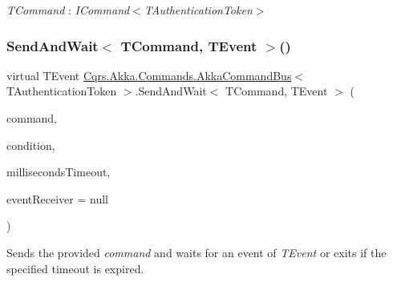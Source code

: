 \begin{Desc}
\item[Type Constraints]\begin{description}
\item[{\em T\+Command} : {\em I\+Command$<$T\+Authentication\+Token$>$}]\end{description}
\end{Desc}
\mbox{\label{classCqrs_1_1Akka_1_1Commands_1_1AkkaCommandBus_affd63fcc939b04803ca58dad194fc723}} 
\subsubsection{\texorpdfstring{Send\+And\+Wait$<$ T\+Command, T\+Event $>$()}{SendAndWait< TCommand, TEvent >()}\hspace{0.1cm}{\footnotesize\ttfamily [5/6]}}
{\footnotesize\ttfamily virtual T\+Event \hyperlink{classCqrs_1_1Akka_1_1Commands_1_1AkkaCommandBus}{Cqrs.\+Akka.\+Commands.\+Akka\+Command\+Bus}$<$ T\+Authentication\+Token $>$.Send\+And\+Wait$<$ T\+Command, T\+Event $>$ (\begin{DoxyParamCaption}\item[{T\+Command}]{command,  }\item[{Func$<$ I\+Enumerable$<$ \hyperlink{interfaceCqrs_1_1Events_1_1IEvent}{I\+Event}$<$ T\+Authentication\+Token $>$$>$, T\+Event $>$}]{condition,  }\item[{int}]{milliseconds\+Timeout,  }\item[{\hyperlink{interfaceCqrs_1_1Events_1_1IEventReceiver}{I\+Event\+Receiver}$<$ T\+Authentication\+Token $>$}]{event\+Receiver = {\ttfamily null} }\end{DoxyParamCaption})\hspace{0.3cm}{\ttfamily [virtual]}}



Sends the provided {\itshape command}  and waits for an event of {\itshape T\+Event}  or exits if the specified timeout is expired. 


